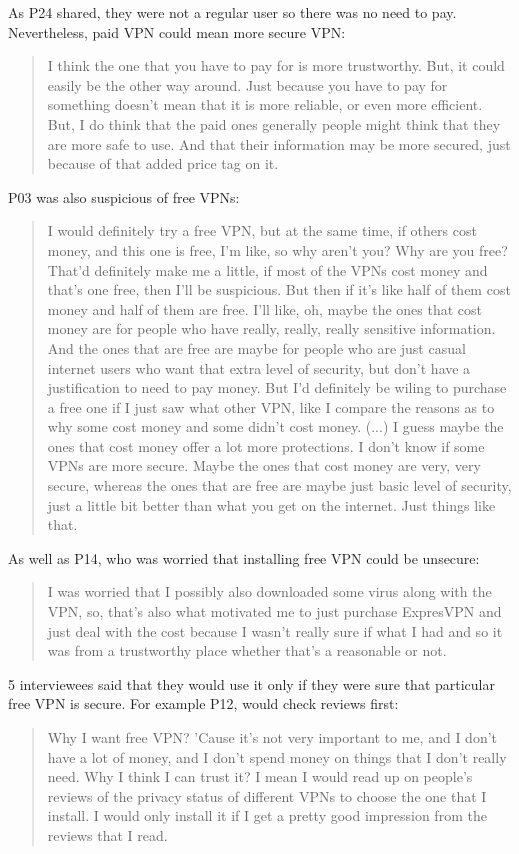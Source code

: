 As P24 shared, they were not a regular user so there was no need to pay.
Nevertheless, paid VPN could mean more secure VPN: \begin{quote} I think the
one that you have to pay for is more trustworthy. But, it could easily be the
other way around. Just because you have to pay for something doesn't mean that
it is more reliable, or even more efficient. But, I do think that the paid
ones generally people might think that they are more safe to use. And that
their information may be more secured, just because of that added price tag on
it.\end{quote}

P03 was also suspicious of free VPNs: \begin{quote}I would definitely try a
free VPN, but at the same time, if others cost money, and this one is free,
I'm like, so why aren't you? Why are you free? That'd definitely make me a
little, if most of the VPNs cost money and that's one free, then I'll be
suspicious. But then if it's like half of them cost money and half of them are
free. I'll like, oh, maybe the ones that cost money are for people who have
really, really, really sensitive information. And the ones that are free are
maybe for people who are just casual internet users who want that extra level
of security, but don't have a justification to need to pay money. But I'd
definitely be wiling to purchase a free one if I just saw what other VPN, like
I compare the reasons as to why some cost money and some didn't cost money.
(...) I guess maybe the ones that cost money offer a lot more protections. I
don't know if some VPNs are more secure. Maybe the ones that cost money are
very, very secure, whereas the ones that are free are maybe just basic level
of security, just a little bit better than what you get on the internet. Just
things like that.\end{quote}

As well as P14, who was worried that installing free VPN could be unsecure:
\begin{quote}I was worried that I possibly also downloaded some virus along
with the VPN, so, that's also what motivated me to just purchase ExpresVPN and
just deal with the cost because I wasn't really sure if what I had and so it
was from a trustworthy place whether that's a reasonable or not.\end{quote}

5 interviewees said that they would use it only if they were sure that
particular free VPN is secure. For example P12, would check reviews first:
\begin{quote}Why I want free VPN? 'Cause it's not very important to me, and I
don't have a lot of money, and I don't spend money on things that I don't
really need. Why I think I can trust it? I mean I would read up on people's
reviews of the privacy status of different VPNs to choose the one that I
install. I would only install it if I get a pretty good impression from the
reviews that I read.\end{quote}

